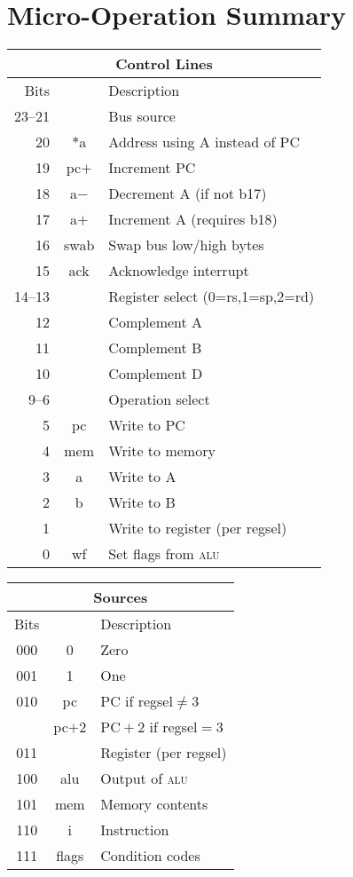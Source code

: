 \documentclass[11pt]{book}
\begin{document}

\chapter{Micro-Operation Summary}
\begin{multicols}{2}\noindent
\begin{tabular}{rcl}
  \toprule
  \multicolumn{3}{c}{\textbf{Control Lines}}\\\midrule
  Bits&&Description\\\midrule
  23--21&&Bus source\\
  20&\(\ast\)a&Address using A instead of PC\\
  19&pc\(+\)&Increment PC\\
  18&a\(-\)&Decrement A (if not b17)\\
  17&a\(+\)&Increment A (requires b18)\\
  16&swab&Swap bus low/high bytes\\
  15&ack&Acknowledge interrupt\\
  14--13&&Register select (0=rs,1=sp,2=rd)\\
  12&&Complement A\\
  11&&Complement B\\
  10&&Complement D\\
  9--6&&Operation select\\
  5&pc&Write to PC\\
  4&mem&Write to memory\\
  3&a&Write to A\\
  2&b&Write to B\\
  1&&Write to register (per regsel)\\
  0&wf&Set flags from \textsc{alu}\\\bottomrule
\end{tabular}

\vspace{\baselineskip}\noindent
\begin{tabular}{ccl}
  \toprule
  \multicolumn{3}{c}{\textbf{Sources}}\\\midrule
  Bits&&Description\\\midrule
  000&0&Zero\\
  001&1&One\\
  010&pc&PC if regsel\({}\neq{}\)3\\
  &pc\(+\)2&PC\({}+{}\)2 if regsel\({}={}\)3\\
  011&&Register (per regsel)\\
  100&alu&Output of \textsc{alu}\\
  101&mem&Memory contents\\
  110&i&Instruction\\
  111&flags&Condition codes\\
  \bottomrule
\end{tabular}


\end{multicols}
\end{document}
